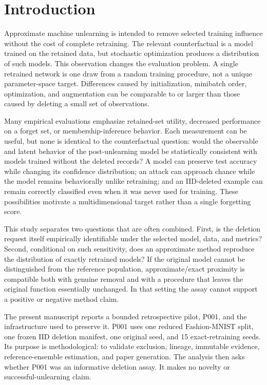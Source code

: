 \section{Introduction}
Approximate machine unlearning is intended to remove selected training influence without
the cost of complete retraining. The relevant counterfactual is a model trained on the
retained data, but stochastic optimization produces a distribution of such models. This
observation changes the evaluation problem. A single retrained network is one draw from a
random training procedure, not a unique parameter-space target. Differences caused by
initialization, minibatch order, optimization, and augmentation can be comparable to or
larger than those caused by deleting a small set of observations.

Many empirical evaluations emphasize retained-set utility, decreased performance on a
forget set, or membership-inference behavior. Each measurement can be useful, but none is
identical to the counterfactual question: would the observable and latent behavior of the
post-unlearning model be statistically consistent with models trained without the deleted
records? A model can preserve test accuracy while changing its confidence distribution; an
attack can approach chance while the model remains behaviorally unlike retraining; and an
IID-deleted example can remain correctly classified even when it was never used for
training. These possibilities motivate a multidimensional target rather than a single
forgetting score.

This study separates two questions that are often combined. First, is the deletion request
itself empirically identifiable under the selected model, data, and metrics? Second,
conditional on such sensitivity, does an approximate method reproduce the distribution of
exactly retrained models? If the original model cannot be distinguished from the reference
population, approximate/exact proximity is compatible both with genuine removal and with a
procedure that leaves the original function essentially unchanged. In that setting the
assay cannot support a positive or negative method claim.

The present manuscript reports a bounded retrospective pilot, P001, and the infrastructure
used to preserve it. P001 uses one reduced Fashion-MNIST split, one frozen IID deletion
manifest, one original seed, and 15 exact-retraining seeds. Its purpose is methodological:
to validate exclusion, lineage, immutable evidence, reference-ensemble estimation, and
paper generation. The analysis then asks whether P001 was an informative deletion assay.
It makes no novelty or successful-unlearning claim.

